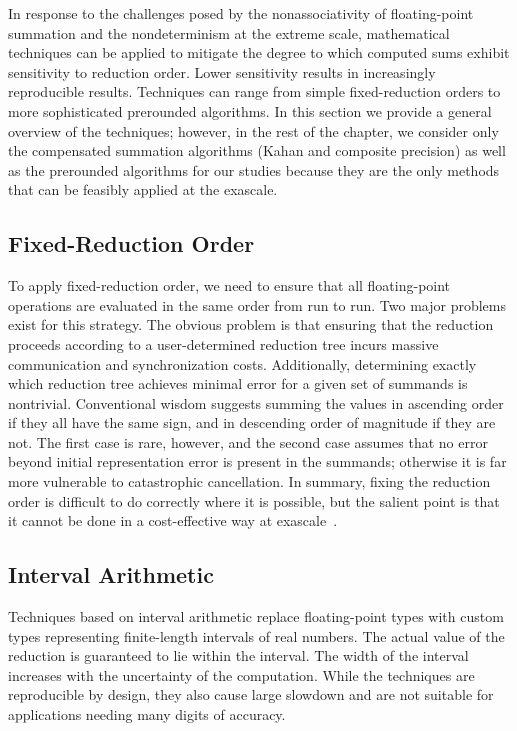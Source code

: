 In response to the challenges posed by the nonassociativity of
floating-point summation and the nondeterminism at the extreme scale,
mathematical techniques can be applied to mitigate the degree to which
computed sums exhibit sensitivity to reduction order. Lower
sensitivity results in increasingly reproducible results.  Techniques
can range from simple fixed-reduction orders to more sophisticated
prerounded algorithms. In this section we provide a general overview
of the techniques; however, in the rest of the chapter, we consider only
the compensated summation algorithms (Kahan and composite precision)
as well as the prerounded algorithms for our studies because they are
the only methods that can be feasibly applied at the exascale.

\subsection{Fixed-Reduction Order}

To apply fixed-reduction order, we need to ensure that all
floating-point operations are evaluated in the same order from run to
run. Two major problems exist for this strategy. The obvious problem
is that ensuring that the reduction proceeds according to a
user-determined reduction tree incurs massive communication and
synchronization costs.  Additionally, determining exactly which
reduction tree achieves minimal error for a given set of summands is
nontrivial. Conventional wisdom suggests summing the values in
ascending order if they all have the same sign, and in descending
order of magnitude if they are not. The first case is rare, however,
and the second case assumes that no error beyond initial
representation error is present in the summands; otherwise it is far
more vulnerable to catastrophic cancellation.  In summary, fixing the
reduction order is difficult to do correctly where it is possible, but
the salient point is that it cannot be done in a cost-effective way at
exascale~\cite{Demmel_Hida}.

\subsection{Interval Arithmetic}

Techniques based on interval arithmetic replace floating-point types
with custom types representing finite-length intervals of real
numbers. The actual value of the reduction is guaranteed to lie within
the interval. The width of the interval increases with the uncertainty
of the computation. While the techniques are reproducible by design,
they also cause large slowdown and are not suitable for applications
needing many digits of accuracy.

